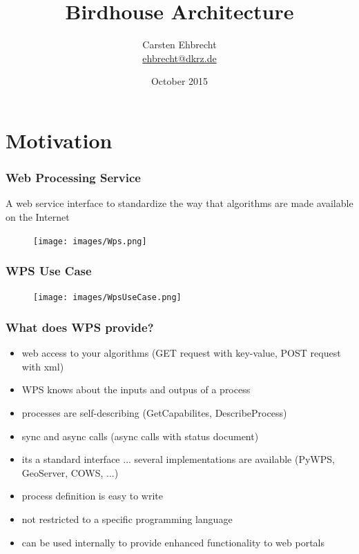 \documentclass{beamer}
\title{Birdhouse Architecture}
\author{
Carsten Ehbrecht\\
\medskip
{\scriptsize \url{ehbrecht@dkrz.de}}
}
\institute{German Climate Computing Center (DKRZ)}
\date{October 2015}
\begin{document}

  \begin{frame}[plain]
    \titlepage
  \end{frame}




  \section{Motivation}

  \begin{frame}[plain]
    \frametitle{Web Processing Service}
    A web service interface to standardize the way that algorithms are made available on the Internet
    \begin{figure}
      \texttt{[image: images/Wps.png]}
    \end{figure}
  \end{frame}


  \begin{frame}[plain]
    \frametitle{WPS Use Case}
    \begin{figure}
      \texttt{[image: images/WpsUseCase.png]}
    \end{figure}
  \end{frame}



  \begin{frame}
    \frametitle{What does WPS provide?}
    \begin{itemize}
      \item web access to your algorithms (GET request with key-value, POST request with xml)
      \item WPS knows about the inputs and outpus of a process
      \item processes are self-describing (GetCapabilites, DescribeProcess)
      \item sync and async calls (async calls with status document)
      \item its a standard interface ... several implementations are available (PyWPS, GeoServer, COWS, ...)
      \item process definition is easy to write
      \item not restricted to a specific programming language
      \item can be used internally to provide enhanced functionality to web portals
    \end{itemize}
  \end{frame}
\end{document}
